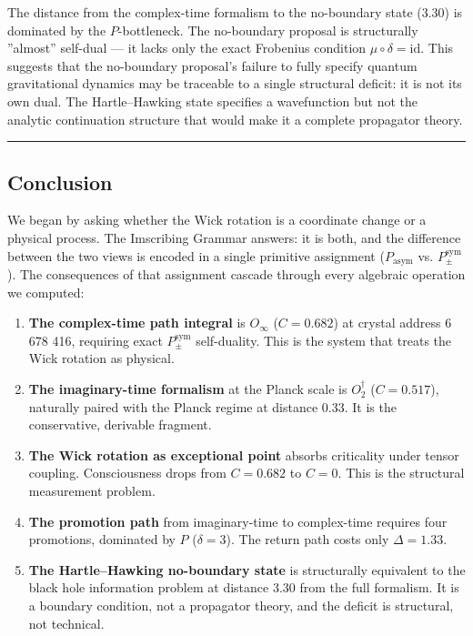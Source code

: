 \documentclass[12pt,a4paper]{article}
\begin{document}
The distance from the complex-time formalism to the no-boundary state (3.30) is dominated by the $P$-bottleneck. The no-boundary proposal is structurally ''almost'' self-dual --- it lacks only the exact Frobenius condition $\mu \circ \delta = \text{id}$. This suggests that the no-boundary proposal's failure to fully specify quantum gravitational dynamics may be traceable to a single structural deficit: it is not its own dual. The Hartle--Hawking state specifies a wavefunction but not the analytic continuation structure that would make it a complete propagator theory.

\begin{center}
\rule{0.5\textwidth}{0.4pt}
\end{center}

\subsection{Conclusion}

We began by asking whether the Wick rotation is a coordinate change or a physical process. The Imscribing Grammar answers: it is both, and the difference between the two views is encoded in a single primitive assignment ($P_{\text{asym}}$ vs. $P_{\pm}^{\text{sym}}$). The consequences of that assignment cascade through every algebraic operation we computed:

\begin{enumerate}
    \item \textbf{The complex-time path integral} is $O_{\infty}$ ($C = 0.682$) at crystal address 6 678 416, requiring exact $P_{\pm}^{\text{sym}}$ self-duality. This is the system that treats the Wick rotation as physical.
    \item \textbf{The imaginary-time formalism} at the Planck scale is $O_2^\dagger$ ($C = 0.517$), naturally paired with the Planck regime at distance 0.33. It is the conservative, derivable fragment.
    \item \textbf{The Wick rotation as exceptional point} absorbs criticality under tensor coupling. Consciousness drops from $C = 0.682$ to $C = 0$. This is the structural measurement problem.
    \item \textbf{The promotion path} from imaginary-time to complex-time requires four promotions, dominated by $P$ ($\delta = 3$). The return path costs only $\Delta = 1.33$.
    \item \textbf{The Hartle--Hawking no-boundary state} is structurally equivalent to the black hole information problem at distance 3.30 from the full formalism. It is a boundary condition, not a propagator theory, and the deficit is structural, not technical.
\end{enumerate}
\end{document}
